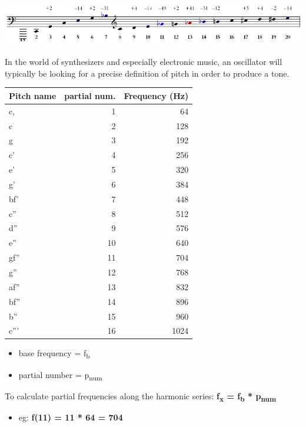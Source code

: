 \documentclass[11pt]{article}
\begin{document}
\begin{center}
\includegraphics[width=.9\linewidth]{./images/Harmonic_Series1.png}
\end{center}

In the world of synthesizers and especially electronic music, an
oscillator will typically be looking for a precise definition of pitch
in order to produce a tone. 

\begin{center}
\begin{tabular}{lrr}
Pitch name & partial num. & Frequency (Hz)\\
\hline
c, & 1 & 64\\
c & 2 & 128\\
g & 3 & 192\\
c' & 4 & 256\\
e' & 5 & 320\\
g' & 6 & 384\\
bf' & 7 & 448\\
c'' & 8 & 512\\
d'' & 9 & 576\\
e'' & 10 & 640\\
gf'' & 11 & 704\\
g'' & 12 & 768\\
af'' & 13 & 832\\
bf'' & 14 & 896\\
b'' & 15 & 960\\
c''' & 16 & 1024\\
\end{tabular}
\end{center}


\begin{itemize}
\item base frequency = f\textsubscript{b}
\item partial number = p\textsubscript{num}
\end{itemize}

To calculate partial frequencies along the harmonic series:
\textbf{f\textsubscript{x} = f\textsubscript{b} * p\textsubscript{num}}

\begin{itemize}
\item eg: \textbf{f(11) = 11 * 64 = 704}
\end{itemize}
\end{document}
